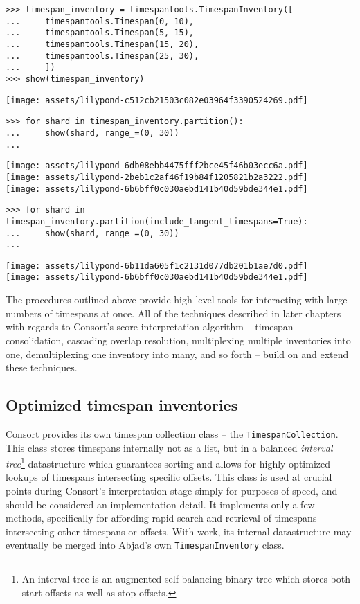\begin{singlespacing}
\vspace{-0.5\baselineskip}
\begin{lstlisting}
>>> timespan_inventory = timespantools.TimespanInventory([
...     timespantools.Timespan(0, 10),
...     timespantools.Timespan(5, 15),
...     timespantools.Timespan(15, 20),
...     timespantools.Timespan(25, 30),
...     ])
>>> show(timespan_inventory)
\end{lstlisting}
\noindent\texttt{[image: assets/lilypond-c512cb21503c082e03964f3390524269.pdf]}
\begin{lstlisting}
>>> for shard in timespan_inventory.partition():
...     show(shard, range_=(0, 30))
...
\end{lstlisting}
\noindent\texttt{[image: assets/lilypond-6db08ebb4475fff2bce45f46b03ecc6a.pdf]}\\
\noindent\texttt{[image: assets/lilypond-2beb1c2af46f19b84f1205821b2a3222.pdf]}\\
\noindent\texttt{[image: assets/lilypond-6b6bff0c030aebd141b40d59bde344e1.pdf]}
\begin{lstlisting}
>>> for shard in timespan_inventory.partition(include_tangent_timespans=True):
...     show(shard, range_=(0, 30))
...
\end{lstlisting}
\noindent\texttt{[image: assets/lilypond-6b11da605f1c2131d077db201b1ae7d0.pdf]}\\
\noindent\texttt{[image: assets/lilypond-6b6bff0c030aebd141b40d59bde344e1.pdf]}
\end{singlespacing}

The procedures outlined above provide high-level tools for interacting with
large numbers of timespans at once. All of the techniques described in later
chapters with regards to Consort's score interpretation algorithm -- timespan
consolidation, cascading overlap resolution, multiplexing multiple inventories
into one, demultiplexing one inventory into many, and so forth -- build on and
extend these techniques.

\subsection{Optimized timespan inventories} %

Consort provides its own timespan collection class -- the
\texttt{TimespanCollection}. This class stores timespans internally not as a
list, but in a balanced \emph{interval tree}\footnote{An interval tree is an
augmented self-balancing binary tree which stores both start offsets as well as
stop offsets.} datastructure which guarantees sorting and allows for highly
optimized lookups of timespans intersecting specific offsets. This class is
used at crucial points during Consort's interpretation stage simply for
purposes of speed, and should be considered an implementation detail. It
implements only a few methods, specifically for affording rapid search and
retrieval of timespans intersecting other timespans or offsets. With work, its
internal datastructure may eventually be merged into Abjad's own
\texttt{TimespanInventory} class.

